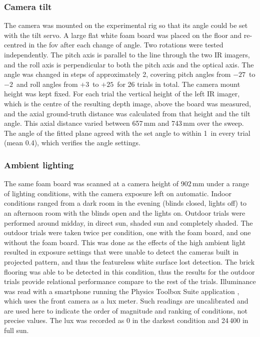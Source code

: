 
\subsubsection{Camera tilt}

The camera was mounted on the experimental rig so that its angle could be set with the tilt servo. A large flat white foam board was placed on the floor and re-centred in the \gls{fov} after each change of angle. Two rotations were tested independently. The pitch axis is parallel to the line through the two IR imagers, and the roll axis is perpendicular to both the pitch axis and the optical axis. The angle was changed in steps of approximately 2\degree, covering pitch angles from $-27$\degree\ to $-2$\degree\ and roll angles from $+3$\degree\ to $+25$\degree\ for 26 trials in total. The camera mount height was kept fixed. For each trial the vertical height of the left IR imager, which is the centre of the resulting depth image, above the board was measured, and the axial ground-truth distance was calculated from that height and the tilt angle. This axial distance varied between 657\,mm and 743\,mm over the sweep. The angle of the fitted plane agreed with the set angle to within 1\degree\ in every trial (mean 0.4\degree), which verifies the angle settings.


\subsubsection{Ambient lighting}

The same foam board was scanned at a camera height of 902\,mm under a range of lighting conditions, with the camera exposure left on automatic. Indoor conditions ranged from a dark room in the evening (blinds closed, lights off) to an afternoon room with the blinds open and the lights on. Outdoor trials were performed around midday, in direct sun, shaded sun and completely shaded.
The outdoor trials were taken twice per condition, one with the foam board, and one without the foam board. This was done as the effects of the high ambient light resulted in exposure settings that were unable to detect the cameras built in projected pattern, and thus the featureless white surface lost detection. The brick flooring was able to be detected in this condition, thus the results for the outdoor trials provide relational performance compare to the rest of the trials.
Illuminance was read with a smartphone running the Physics Toolbox Suite application \cite{PhysicsToolboxSensor}, which uses the front camera as a lux meter. Such readings are uncalibrated and are used here to indicate the order of magnitude and ranking of conditions, not precise values. The lux was recorded as 0 in the darkest condition and 24\,400 in full sun.


